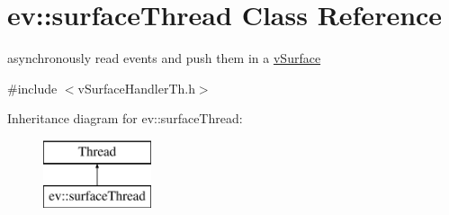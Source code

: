 \hypertarget{classev_1_1surfaceThread}{}\section{ev\+:\+:surface\+Thread Class Reference}
\label{classev_1_1surfaceThread}


asynchronously read events and push them in a \hyperlink{classev_1_1vSurface}{v\+Surface}  




{\ttfamily \#include $<$v\+Surface\+Handler\+Th.\+h$>$}

Inheritance diagram for ev\+:\+:surface\+Thread\+:\begin{figure}[H]
\begin{center}
\leavevmode
\includegraphics[height=2.000000cm]{classev_1_1surfaceThread}
\end{center}
\end{figure}
